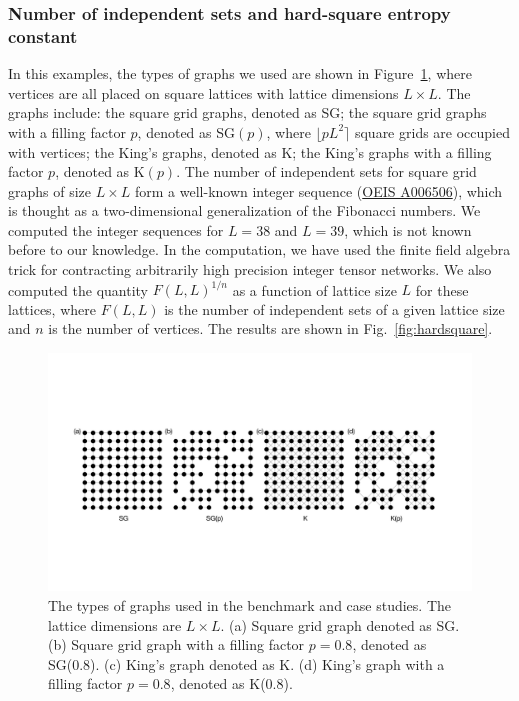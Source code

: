\documentclass[onefignum, onetabnum]{siamart190516}
\newcommand{\<}{\langle}
\renewcommand{\>}{\rangle}
\newcommand{\Fig}[1]{Fig.~\ref{#1}}
\newcounter{example}
\begin{document}
\subsubsection{Number of independent sets and hard-square entropy constant}
In this examples, the types of graphs we used are shown in Figure~\ref{fig:lattices}, where vertices are all placed on square lattices with lattice dimensions $L \times L$.
The graphs include: the square grid graphs, denoted as SG; the square grid graphs with a filling factor $p$, denoted as SG$(p)$, where $\lfloor pL^{2} \rceil$ square grids are occupied with vertices;
the King's graphs, denoted as K; the King's graphs with a filling factor $p$, denoted as K$(p)$. 
The number of independent sets for square grid graphs of size $L \times L$ form a well-known integer sequence (\href{https://oeis.org/A006506}{OEIS A006506}), which is thought as a two-dimensional generalization of the Fibonacci numbers.
We computed the integer sequences for $L=38$ and $L=39$, which is not known before to our knowledge.
In the computation, we have used the finite field algebra trick for contracting arbitrarily high precision integer tensor networks.
We also computed the quantity $F(L,L)^{1/n}$ as a function of lattice size $L$ for these lattices,
where $F(L,L)$ is the number of independent sets of a given lattice size and $n$ is the number of vertices.
The results are shown in \Fig{fig:hardsquare}.

\begin{figure}[t] 
    \centering
    \includegraphics[width=\textwidth, trim={0cm 0cm 0cm 0cm}, clip]{lattices.pdf}
    \caption{The types of graphs used in the benchmark and case studies.
    The lattice dimensions are $L\times L$. (a) Square grid graph denoted as SG. (b) Square grid graph with a filling factor $p=0.8$, denoted as SG(0.8).
    (c) King's graph denoted as K. (d) King's graph with a filling factor $p=0.8$, denoted as K(0.8).}
    \label{fig:lattices}
\end{figure}
\end{document}
